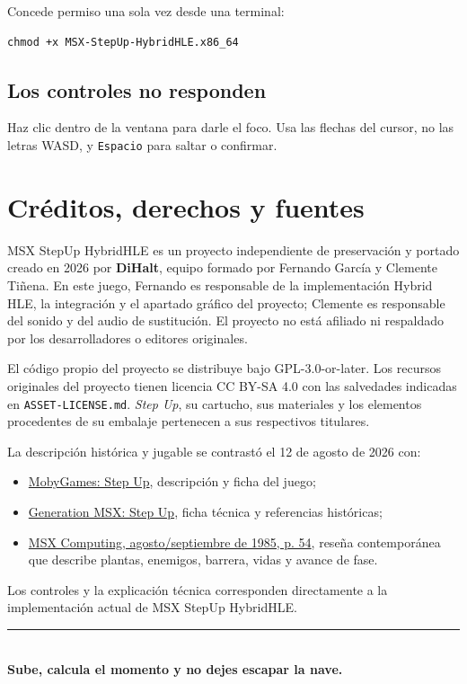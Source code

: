 \documentclass[11pt,a4paper]{article}
\newcommand{\tecla}[1]{%
  \begingroup
  \setlength{\fboxsep}{3pt}%
  \colorbox{softgray}{\texttt{#1}}%
  \endgroup
}
\begin{document}
Concede permiso una sola vez desde una terminal:

\begin{verbatim}
chmod +x MSX-StepUp-HybridHLE.x86_64
\end{verbatim}

\subsection*{Los controles no responden}

Haz clic dentro de la ventana para darle el foco. Usa las flechas del cursor,
no las letras WASD, y \tecla{Espacio} para saltar o confirmar.

\section{Créditos, derechos y fuentes}

MSX StepUp HybridHLE es un proyecto independiente de preservación y portado
creado en 2026 por \textbf{DiHalt}, equipo formado por Fernando García y
Clemente Tiñena. En este juego, Fernando es responsable de la implementación
Hybrid HLE, la integración y el apartado gráfico del proyecto; Clemente es
responsable del sonido y del audio de sustitución. El proyecto no está
afiliado ni respaldado por los desarrolladores o editores originales.

El código propio del proyecto se distribuye bajo GPL-3.0-or-later. Los recursos
originales del proyecto tienen licencia CC BY-SA 4.0 con las salvedades
indicadas en \texttt{ASSET-LICENSE.md}. \textit{Step Up}, su cartucho, sus
materiales y los elementos procedentes de su embalaje pertenecen a sus
respectivos titulares.

La descripción histórica y jugable se contrastó el 12 de agosto de 2026 con:

\begin{itemize}
  \item \href{https://www.mobygames.com/game/19749/step-up/}%
        {MobyGames: Step Up}, descripción y ficha del juego;
  \item \href{https://www.generation-msx.nl/software/takara-marvel-soft/step-up/42/}%
        {Generation MSX: Step Up}, ficha técnica y referencias históricas;
  \item \href{https://files.techinfo.newmsx.nl/Magazines/EN/MSX\%20Computing/MSX\%20Computing\%201985-08.pdf}%
        {MSX Computing, agosto/septiembre de 1985, p. 54}, reseña contemporánea
        que describe plantas, enemigos, barrera, vidas y avance de fase.
\end{itemize}

Los controles y la explicación técnica corresponden directamente a la
implementación actual de MSX StepUp HybridHLE.

\vfill
\begin{center}
\textcolor{msxblue}{\rule{0.65\textwidth}{0.6pt}}\\[5pt]
\textbf{Sube, calcula el momento y no dejes escapar la nave.}
\end{center}
\end{document}

